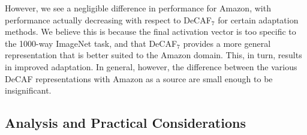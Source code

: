 However, we see a negligible difference in performance for Amazon, with
performance actually decreasing with respect to DeCAF$_7$ for certain adaptation
methods. We believe this is because the final activation vector is too specific
to the 1000-way ImageNet task, and that DeCAF$_7$ provides a more general
representation that is better suited to the Amazon domain. This, in turn,
results in improved adaptation.
In general, however, the difference between the
various DeCAF representations with Amazon as a source are small enough to be
insignificant.

\subsection{Analysis and Practical Considerations}
\label{sec:analysis}




